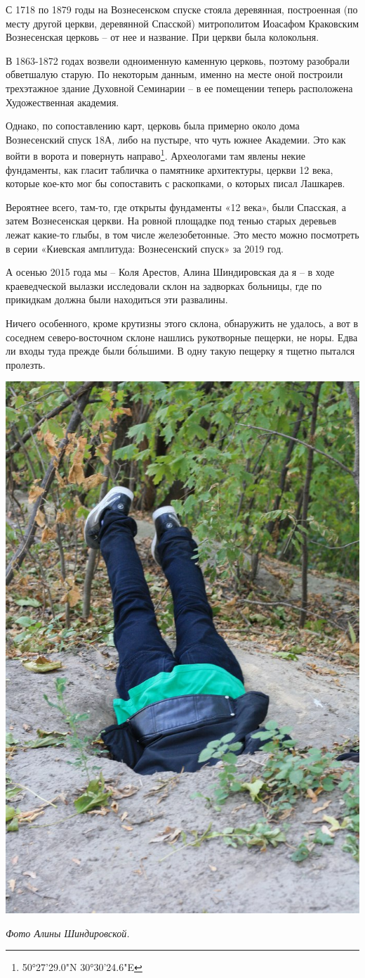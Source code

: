 С 1718 по 1879 годы на Вознесенском спуске стояла деревянная, построенная (по месту другой церкви, деревянной Спасской) митрополитом Иоасафом Краковским Вознесенская церковь – от нее и название. При церкви была колокольня. 

В 1863-1872 годах возвели одноименную каменную церковь, поэтому разобрали обветшалую старую. По некоторым данным, именно на месте оной построили трехэтажное здание Духовной Семинарии – в ее помещении теперь расположена Художественная академия. 

Однако, по сопоставлению карт, церковь была примерно около дома Вознесенский спуск 18А, либо на пустыре, что чуть южнее Академии. Это как войти в ворота и повернуть направо\footnote{50°27'29.0"N 30°30'24.6"E}. Археологами там явлены некие фундаменты, как гласит табличка о памятнике архитектуры, церкви 12 века, которые кое-кто мог бы сопоставить с раскопками, о которых писал Лашкарев. 

Вероятнее всего, там-то, где открыты фундаменты «12 века», были Спасская, а затем Вознесенская церкви. На ровной площадке под тенью старых деревьев лежат какие-то глыбы, в том числе железобетонные. Это место можно посмотреть в серии «Киевская амплитуда: Вознесенский спуск» за 2019 год.

А осенью 2015 года мы – Коля Арестов, Алина Шиндировская да я – в ходе краеведческой вылазки исследовали склон на задворках больницы, где по прикидкам должна были находиться эти развалины.

Ничего особенного, кроме крутизны этого склона, обнаружить не удалось, а вот в соседнем северо-восточном склоне нашлись рукотворные пещерки, не норы. Едва ли входы туда прежде были б\'ольшими. В одну такую пещерку я тщетно пытался пролезть.

\begin{center}
\includegraphics[width=0.65\linewidth]{chast-colebanie-osnov/gora-zamkovaya-valovaya/kraeved02.jpg}

\textit{Фото Алины Шиндировской.}
\end{center}

